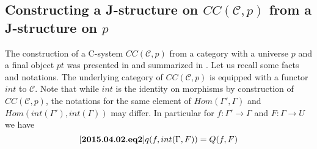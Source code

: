 \documentclass[12pt]{article}
\newenvironment{eq}{\begin{equation}}{\end{equation}}
\newcommand{\llabel}[1]{\label{#1}[{\bf #1}]}
\newcommand{\sr}{\rightarrow}
\begin{document}
\subsection{Constructing a J-structure on $CC({\mathcal C},p)$ from a J-structure on $p$}
%
The construction of a C-system $CC({\mathcal C},p)$ from a category with a universe $p$ and a final object $pt$ was presented in \cite{Cfromauniverse} and summarized in \cite{fromunivwithPi}. Let us recall some facts and notations. The underlying category of $CC({\mathcal C},p)$ is equipped with a functor $int$ to $\mathcal C$. Note that while $int$ is the identity on morphisms by construction of $CC({\mathcal C},p)$, the notations for the same element of $Hom(\Gamma',\Gamma)$ and $Hom(int(\Gamma'),int(\Gamma))$ may differ. In particular for $f:\Gamma'\sr \Gamma$ and $F:\Gamma\sr U$ we have
%
\begin{eq}
\llabel{2015.04.02.eq2}
q(f,int(\Gamma,F))=Q(f,F)
\end{eq}
%
\end{document}
